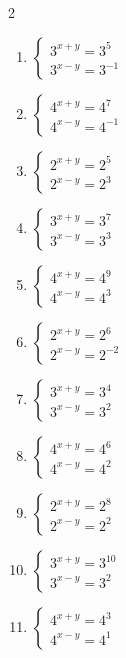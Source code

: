 \documentclass[12pt,a4paper]{article}
\begin{document}
\begin{multicols}{2}
\begin{enumerate}[leftmargin=*, itemsep=6pt]
\item \(\begin{cases} 3^{x+y}=3^{5}\\ 3^{x-y}=3^{-1}\end{cases}\)

\item \(\begin{cases} 4^{x+y}=4^{7}\\ 4^{x-y}=4^{-1}\end{cases}\)

\item \(\begin{cases} 2^{x+y}=2^{5}\\ 2^{x-y}=2^{3}\end{cases}\)

\item \(\begin{cases} 3^{x+y}=3^{7}\\ 3^{x-y}=3^{3}\end{cases}\)

\item \(\begin{cases} 4^{x+y}=4^{9}\\ 4^{x-y}=4^{3}\end{cases}\)

\item \(\begin{cases} 2^{x+y}=2^{6}\\ 2^{x-y}=2^{-2}\end{cases}\)

\item \(\begin{cases} 3^{x+y}=3^{4}\\ 3^{x-y}=3^{2}\end{cases}\)

\item \(\begin{cases} 4^{x+y}=4^{6}\\ 4^{x-y}=4^{2}\end{cases}\)

\item \(\begin{cases} 2^{x+y}=2^{8}\\ 2^{x-y}=2^{2}\end{cases}\)

\item \(\begin{cases} 3^{x+y}=3^{10}\\ 3^{x-y}=3^{2}\end{cases}\)

\item \(\begin{cases} 4^{x+y}=4^{3}\\ 4^{x-y}=4^{1}\end{cases}\)

\end{enumerate}
\end{multicols}
\newpage
\end{document}
